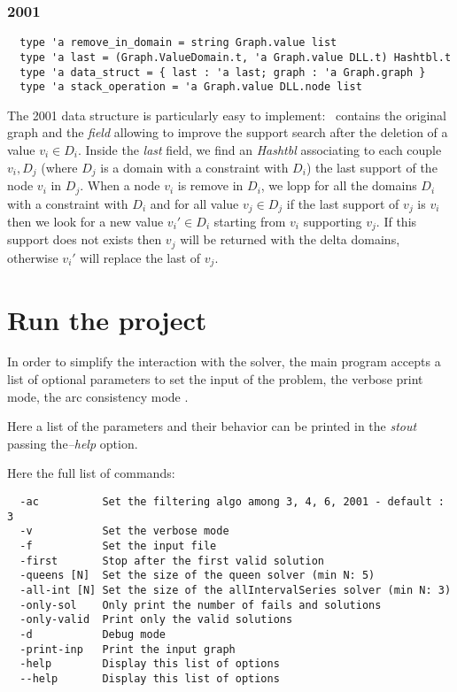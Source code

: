 \documentclass{rapport}
\begin{document}
\subsubsection{\ac{2001}}

\begin{verbatim}
  type 'a remove_in_domain = string Graph.value list
  type 'a last = (Graph.ValueDomain.t, 'a Graph.value DLL.t) Hashtbl.t
  type 'a data_struct = { last : 'a last; graph : 'a Graph.graph }
  type 'a stack_operation = 'a Graph.value DLL.node list
\end{verbatim}

The \ac{2001} data structure is particularly easy to implement: \ds\ contains the original graph and the \textit{field} allowing to improve the support search after the deletion of a value $v_i \in D_i$. Inside the \textit{last} field, we find an \textit{Hashtbl} associating to each couple $v_i, D_j$ (where $D_j$ is a domain with a constraint with $D_i$) the last support of the node $v_i$ in $D_j$. When a node $v_i$ is remove in $D_i$, we lopp for all the domains $D_i$ with a constraint with $D_i$ and for all value $v_j\in D_j$ if the last support of $v_j$ is $v_i$ then we look for a new value $v_i' \in D_i$ starting from $v_i$ supporting $v_j$. If this support does not exists then $v_j$ will be returned with the delta domains, otherwise $v_i'$ will replace the last of $v_j$.

\section{Run the project}
\label{sec:arg}

In order to simplify the interaction with the solver, the main program accepts a list of optional parameters to set the input of the problem, the verbose print mode, the arc consistency mode \etc.

Here a list of the parameters and their behavior can be printed in the \textit{stout} passing the\textit{--help} option.

Here the full list of commands:

\begin{verbatim}
  -ac          Set the filtering algo among 3, 4, 6, 2001 - default : 3
  -v           Set the verbose mode
  -f           Set the input file
  -first       Stop after the first valid solution
  -queens [N]  Set the size of the queen solver (min N: 5)
  -all-int [N] Set the size of the allIntervalSeries solver (min N: 3)
  -only-sol    Only print the number of fails and solutions
  -only-valid  Print only the valid solutions
  -d           Debug mode
  -print-inp   Print the input graph
  -help        Display this list of options
  --help       Display this list of options
\end{verbatim}
\end{document}

